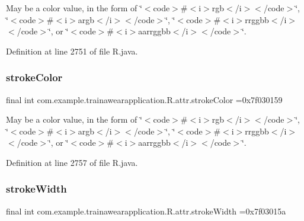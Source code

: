 May be a color value, in the form of \char`\"{}$<$code$>$\#$<$i$>$rgb$<$/i$>$$<$/code$>$\char`\"{}, \char`\"{}$<$code$>$\#$<$i$>$argb$<$/i$>$$<$/code$>$\char`\"{}, \char`\"{}$<$code$>$\#$<$i$>$rrggbb$<$/i$>$$<$/code$>$\char`\"{}, or \char`\"{}$<$code$>$\#$<$i$>$aarrggbb$<$/i$>$$<$/code$>$\char`\"{}. 

Definition at line 2751 of file R.\+java.

\mbox{\label{classcom_1_1example_1_1trainawearapplication_1_1_r_1_1attr_a0e5a40e42df2c80948977bb6b835b601}} 
\subsubsection{\texorpdfstring{strokeColor}{strokeColor}}
{\footnotesize\ttfamily final int com.\+example.\+trainawearapplication.\+R.\+attr.\+stroke\+Color =0x7f030159\hspace{0.3cm}{\ttfamily [static]}}

May be a color value, in the form of \char`\"{}$<$code$>$\#$<$i$>$rgb$<$/i$>$$<$/code$>$\char`\"{}, \char`\"{}$<$code$>$\#$<$i$>$argb$<$/i$>$$<$/code$>$\char`\"{}, \char`\"{}$<$code$>$\#$<$i$>$rrggbb$<$/i$>$$<$/code$>$\char`\"{}, or \char`\"{}$<$code$>$\#$<$i$>$aarrggbb$<$/i$>$$<$/code$>$\char`\"{}. 

Definition at line 2757 of file R.\+java.

\mbox{\label{classcom_1_1example_1_1trainawearapplication_1_1_r_1_1attr_a98158d450e24db795fd993f7c358336a}} 
\subsubsection{\texorpdfstring{strokeWidth}{strokeWidth}}
{\footnotesize\ttfamily final int com.\+example.\+trainawearapplication.\+R.\+attr.\+stroke\+Width =0x7f03015a\hspace{0.3cm}{\ttfamily [static]}}

